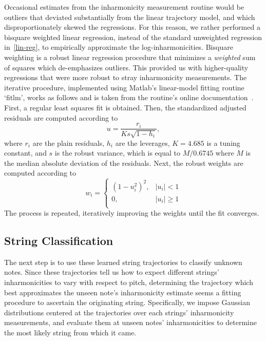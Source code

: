 \documentclass[12pt]{cmuthesis}
\begin{document}
Occasional estimates from the inharmonicity measurement routine would be outliers that deviated substantially from the linear trajectory model, and which disproportionately skewed the regressions. For this reason, we rather performed a bisquare weighted linear regression, instead of the standard unweighted regression in~\eqref{lin-reg}, to empirically approximate the log-inharmonicities. Bisquare weighting is a robust linear regression procedure that minimizes a \textit{weighted} sum of squares which de-emphasizes outliers. This provided us with higher-quality regressions that were more robust to stray inharmonicity measurements. The iterative procedure, implemented using Matlab's linear-model fitting routine `fitlm', works as follows and is taken from the routine's online documentation~\cite{matlab-robustfit}. First, a regular least squares fit is obtained. Then, the standardized adjusted residuals are computed according to
\begin{equation}
u = \frac{r_i}{Ks\sqrt{1-h_i}},
\end{equation}
where $r_i$ are the plain residuals, $h_i$ are the leverages, $K = 4.685$ is a tuning constant, and $s$ is the robust variance, which is equal to $M/0.6745$ where $M$ is the median absolute deviation of the residuals. Next, the robust weights are computed according to
\begin{equation}
w_i = \begin{cases}
(1-u_i^2)^2, & |u_i| < 1\\
0, & |u_i| \geq 1\\
\end{cases}
\end{equation} 
The process is repeated, iteratively improving the weights until the fit converges.

\subsection{String Classification}
\label{sec:string-classification}
The next step is to use these learned string trajectories to classify unknown notes. Since these trajectories tell us how to expect different strings' inharmonicities to vary with respect to pitch, determining the trajectory which best approximates the unseen note's inharmonicity estimate seems a fitting procedure to ascertain the originating string. Specifically, we impose Gaussian distributions centered at the trajectories over each strings' inharmonicity measurements, and evaluate them at unseen notes' inharmonicities to determine the most likely string from which it came.
\end{document}
